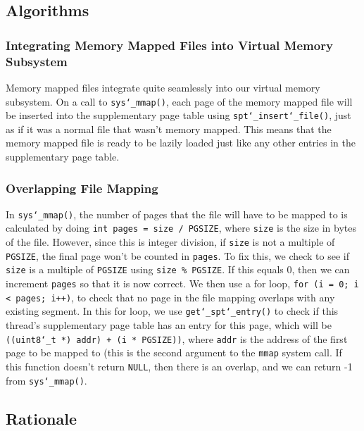 \documentclass{article}
\renewcommand{\_}{\char`_}
\begin{document}
\subsection{Algorithms}

\subsubsection{Integrating Memory Mapped Files into Virtual Memory Subsystem}

Memory mapped files integrate quite seamlessly into our virtual memory subsystem. On a call to \texttt{sys\_mmap()}, each page of the memory mapped file will be inserted into the supplementary page table using \texttt{spt\_insert\_file()}, just as if it was a normal file that wasn't memory mapped. This means that the memory mapped file is ready to be lazily loaded just like any other entries in the supplementary page table.

\subsubsection{Overlapping File Mapping}

In \texttt{sys\_mmap()}, the number of pages that the file will have to be mapped to is calculated by doing \texttt{int pages = size / PGSIZE}, where \texttt{size} is the size in bytes of the file. However, since this is integer division, if \texttt{size} is not a multiple of \texttt{PGSIZE}, the final page won't be counted in \texttt{pages}. To fix this, we check to see if \texttt{size} is a multiple of \texttt{PGSIZE} using \texttt{size \% PGSIZE}. If this equals 0, then we can increment \texttt{pages} so that it is now correct. We then use a for loop, \texttt{for (i = 0; i < pages; i++)}, to check that no page in the file mapping overlaps with any existing segment. In this for loop, we use \texttt{get\_spt\_entry()} to check if this thread's supplementary page table has an entry for this page, which will be \texttt{((uint8\_t *) addr) + (i * PGSIZE))}, where \texttt{addr} is the address of the first page to be mapped to (this is the second argument to the \texttt{mmap} system call. If this function doesn't return \texttt{NULL}, then there is an overlap, and we can return -1 from \texttt{sys\_mmap()}.

\subsection{Rationale}
\end{document}
